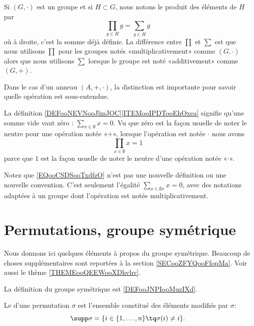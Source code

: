 \begin{normaltext}      \label{NORMooDBOFooQCwbOY}
	Si \( (G,\cdot)\) est un groupe et si \( H\subset G\), nous notons le produit des éléments de \( H\) par
	\begin{equation}
		\prod_{g\in H }g=\sum_{g\in H}g
	\end{equation}
	où à droite, c'est la somme déjà définie. La différence entre \( \prod\) et \( \sum\) est que nous utilisons \( \prod\) pour les groupes notés «multiplicativement» comme \( (G,\cdot)\) alors que nous utilisons \( \sum\) lorsque le groupe est noté «additivement» comme \( (G,+)\).

	Dans le cas d'un anneau \( (A,+,\cdot)\), la distinction est importante pour savoir quelle opération est sous-entendue.

	La définition \ref{DEFooNEVNooJlmJOC}\ref{ITEMooIPDTooEhOxea} signifie qu'une somme vide vaut zéro : \( \sum_{x\in \emptyset}x=0\). Vu que zéro est la façon usuelle de noter le neutre pour une opération notée «\( +\)», lorsque l'opération est notée \( \cdot\) nous avons
	\begin{equation}        \label{EQooCSDSooTxdfzO}
		\prod_{x\in\emptyset}x=1
	\end{equation}
	parce que \( 1\) est la façon usuelle de noter le neutre d'une opération notée «\( \cdot\)».

	Notez que \eqref{EQooCSDSooTxdfzO} n'est pas une nouvelle définition ou une nouvelle convention. C'est seulement l'égalité \( \sum_{x\in\emptyset x}x=0\), avec des notations adaptées à un groupe dont l'opération est notée multiplicativement.
\end{normaltext}






\section{Permutations, groupe symétrique}

Nous donnons ici quelques éléments à propos du groupe symétrique. Beaucoup de choses supplémentaires sont reportées à la section \ref{SECooZFYQooFfopMa}. Voir aussi le thème \ref{THEMEooQEEWooXDhvhv}.

La définition du groupe symétrique est \ref{DEFooJNPIooMuzIXd}.



\begin{definition}      \label{DEFooSupportPermutation}
	Le  d'une permutation \( \sigma\) est l'ensemble constitué des éléments modifiés par \( \sigma\):
	\begin{equation*}
		\supp \sigma = \{ i \in \{1,\ldots,n \} \tq \sigma(i) \neq i\}.
	\end{equation*}
\end{definition}

